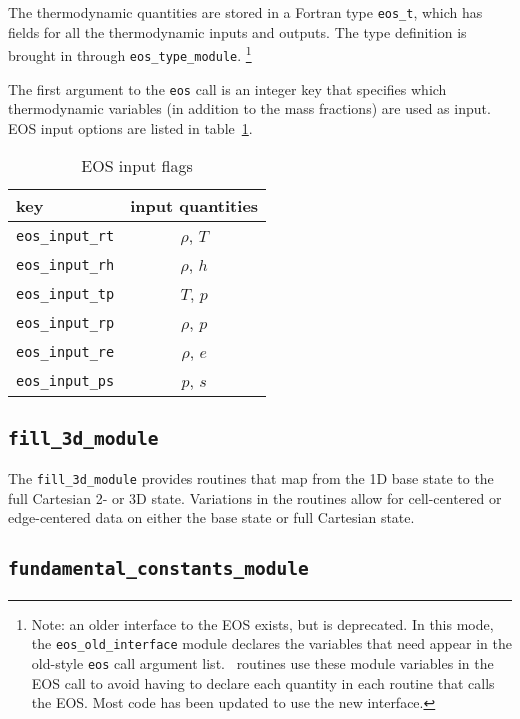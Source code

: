 The thermodynamic quantities are stored in a Fortran type {\tt eos\_t},
which has fields for all the thermodynamic inputs and outputs.  The 
type definition is brought in through {\tt eos\_type\_module}.
\footnote{ Note: an older interface to the EOS exists, but is
  deprecated.  In this mode, the {\tt eos\_old\_interface} module declares 
  the variables that need appear in the old-style {\tt eos} call
  argument list.  \maestro\ routines use these module variables in the
  EOS call to avoid having to declare each quantity in each routine
  that calls the EOS.  Most code has been updated to use the new interface.}

The first argument to the {\tt eos} call is an integer key that
specifies which thermodynamic variables (in addition to the mass
fractions) are used as input.  EOS input options are listed 
in table~\ref{arch:table:eosinput}.

   \begin{table}[h]
   \caption{\label{arch:table:eosinput} EOS input flags}
   \begin{center}
   \begin{tabular}{lc}
   \hline
   key            & input quantities \\
   \hline
   {\tt eos\_input\_rt}       & $\rho$, $T$ \\
   {\tt eos\_input\_rh}       & $\rho$, $h$ \\
   {\tt eos\_input\_tp}       & $T$, $p$ \\
   {\tt eos\_input\_rp}       & $\rho$, $p$ \\
   {\tt eos\_input\_re}       & $\rho$, $e$ \\
   {\tt eos\_input\_ps}       & $p$, $s$ \\
   \hline
   \end{tabular}
   \end{center}
   \end{table}



\subsection{{\tt fill\_3d\_module}}

The {\tt fill\_3d\_module} provides routines that map from the 1D
base state to the full Cartesian 2- or 3D state.  Variations in the
routines allow for cell-centered or edge-centered data on either the
base state or full Cartesian state.

\subsection{\tt fundamental\_constants\_module}

